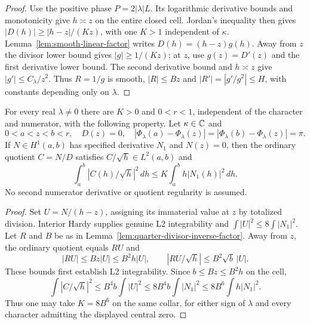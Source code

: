 \begin{proof}
\leanok
Use the positive phase $P=2|\lambda|L$. Its logarithmic derivative
bounds and monotonicity give $h\asymp z$ on the entire closed cell.
Jordan's inequality then gives $|D(h)|\ge|h-z|/(Kz)$, with
one $K>1$ independent of $\kappa$.
Lemma~\ref{lem:smooth-linear-factor} writes $D(h)=(h-z)g(h)$.
Away from $z$ the divisor lower bound gives $|g|\ge1/(Kz)$;
at $z$, use $g(z)=D'(z)$ and the first derivative lower bound.
The second derivative bound and $h\asymp z$ give
$|g'|\le C_\lambda/z^2$.
Thus $R=1/g$ is smooth, $|R|\le Bz$ and
$|R'|=|g'/g^2|\le H$, with constants depending only on $\lambda$.
\end{proof}

\begin{lemma}
\label{lem:phase-cell-mass-estimates}
\leanok
For every real $\lambda\ne0$ there are $K>0$ and $0<r<1$, independent
of the character and numerator, with the following property.
Let $\kappa\in\mathbb{C}$ and
\[
 0<a<z<b<r,\quad D(z)=0,\quad
 |\Phi_\lambda(a)-\Phi_\lambda(z)|
 =|\Phi_\lambda(b)-\Phi_\lambda(z)|=\pi .
\]
If $N\in H^1(a,b)$ has specified derivative $N_1$ and $N(z)=0$, then
the ordinary quotient $C=N/D$ satisfies $C/\sqrt h\in L^2(a,b)$ and
\[
 \int_a^b |C(h)/\sqrt h|^2\,dh
 \le K\int_a^b h|N_1(h)|^2\,dh .
\]
No second numerator derivative or quotient regularity is assumed.
\end{lemma}

\begin{proof}
\leanok
Set $U=N/(h-z)$, assigning its immaterial value at $z$ by totalized
division. Interior Hardy supplies genuine L2 integrability and
$\int|U|^2\le8\int|N_1|^2$.
Let $R$ and $B$ be as in Lemma~\ref{lem:quarter-divisor-inverse-factor}.
Away from $z$, the ordinary quotient equals $RU$ and
\[
 |RU|\le Bz|U|\le B^2h|U|,\qquad
 |RU/\sqrt h|\le B^2\sqrt b\,|U|.
\]
These bounds first establish L2 integrability. Since
$b\le Bz\le B^2h$ on the cell,
\[
 \int|C/\sqrt h|^2
 \le B^4b\int|U|^2
 \le 8B^4b\int|N_1|^2
 \le 8B^6\int h|N_1|^2.
\]
Thus one may take $K=8B^6$ on the same collar, for either sign of
$\lambda$ and every character admitting the displayed central zero.
\end{proof}

